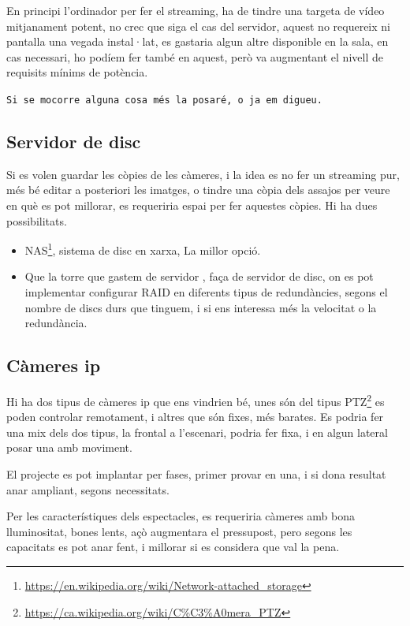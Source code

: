 \documentclass[
  10pt,
]{krantz}
\DeclareRobustCommand{\href}[2]{#2\footnote{\url{#1}}}
\begin{document}
En principi l'ordinador per fer el streaming, ha de tindre una targeta de vídeo mitjanament potent, no crec que siga el cas del servidor, aquest no requereix ni pantalla una vegada instal·lat, es gastaria algun altre disponible en la sala, en cas necessari, ho podíem fer també en aquest, però va augmentant el nivell de requisits mínims de potència.

\texttt{Si\ se\ m\textquotesingle{}ocorre\ alguna\ cosa\ més\ la\ posaré,\ o\ ja\ em\ digueu.}

\hypertarget{servidor-de-disc}{%
\subsection{Servidor de disc}\label{servidor-de-disc}}

Si es volen guardar les còpies de les càmeres, i la idea es no fer un streaming pur, més bé editar a posteriori les imatges, o tindre una còpia dels assajos per veure en què es pot millorar, es requeriria espai per fer aquestes còpies. Hi ha dues possibilitats.

\begin{itemize}
\item
  \href{https://en.wikipedia.org/wiki/Network-attached_storage}{NAS}, sistema de disc en xarxa, La millor opció.
\item
  Que la torre que gastem de servidor , faça de servidor de disc, on es pot implementar configurar RAID en diferents tipus de redundàncies, segons el nombre de discs durs que tinguem, i si ens interessa més la velocitat o la redundància.
\end{itemize}

\hypertarget{cuxe0meres-ip}{%
\subsection{Càmeres ip}\label{cuxe0meres-ip}}

Hi ha dos tipus de càmeres ip que ens vindrien bé, unes són del tipus \href{https://ca.wikipedia.org/wiki/C\%C3\%A0mera_PTZ}{PTZ} es poden controlar remotament, i altres que són fixes, més barates. Es podria fer una mix dels dos tipus, la frontal a l'escenari, podria fer fixa, i en algun lateral posar una amb moviment.

El projecte es pot implantar per fases, primer provar en una, i si dona resultat anar ampliant, segons necessitats.

Per les característiques dels espectacles, es requeriria càmeres amb bona lluminositat, bones lents, açò augmentara el pressupost, pero segons les capacitats es pot anar fent, i millorar si es considera que val la pena.
\end{document}
